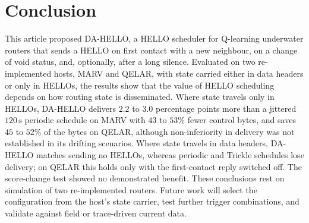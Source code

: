 \section{Conclusion}
\label{sec:conclusion}
This article proposed DA-HELLO, a HELLO scheduler for Q-learning
underwater routers that sends a HELLO on first contact with a new
neighbour, on a change of void status, and, optionally, after a long
silence. Evaluated on two re-implemented hosts, MARV and QELAR, with
state carried either in data headers or only in HELLOs, the results show
that the value of HELLO scheduling depends on how routing state is
disseminated. Where state travels only in HELLOs, DA-HELLO delivers
$2.2$ to $3.0$ percentage points more than a jittered $120\,\mathrm{s}$
periodic schedule on MARV with $43$ to $53\%$ fewer control bytes, and
saves $45$ to $52\%$ of the bytes on QELAR, although non-inferiority in
delivery was not established in its drifting scenarios. Where state
travels in data headers, DA-HELLO matches sending no HELLOs, whereas
periodic and Trickle schedules lose delivery; on QELAR this holds only
with the first-contact reply switched off. The score-change test showed
no demonstrated benefit. These conclusions rest on simulation of two
re-implemented routers. Future work will select the configuration from
the host's state carrier, test further trigger combinations, and
validate against field or trace-driven current data.
